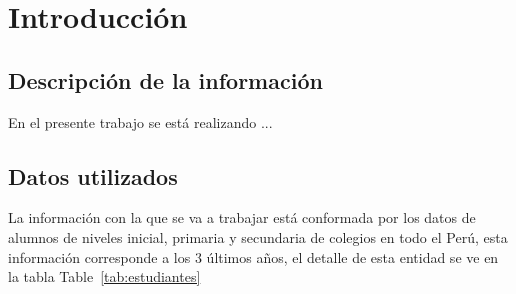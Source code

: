 \chapter{Introducción} %
\label{Chapter1} %


\newcommand{\keyword}[1]{\textbf{#1}}
\newcommand{\tabhead}[1]{\textbf{#1}}
\newcommand{\code}[1]{\texttt{#1}}
\newcommand{\file}[1]{\texttt{\bfseries#1}}
\newcommand{\option}[1]{\texttt{\itshape#1}}


\section{Descripción de la información}

En el presente trabajo se está realizando ...

\section{Datos utilizados}

La información con la que se va a trabajar está conformada por los datos de alumnos de niveles inicial, primaria y secundaria de colegios en todo el Perú, esta información corresponde a los 3 últimos años, el detalle de esta entidad se ve en la tabla Table~\ref{tab:estudiantes}

